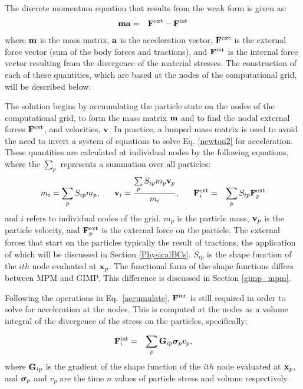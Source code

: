 The discrete momentum equation that results from the weak form is given as:
\begin{eqnarray}
        \bfm \bfa &=& \bfF^{\rm{ext}} - \bfF^{\rm{int}}  \label{newton2}
\end{eqnarray}
where $\bfm$ is the mass matrix, $\bfa$ is the acceleration vector,
$\bfF^{\rm{ext}}$ is the external force vector (sum of the body forces and
tractions), and $\bfF^{\rm{int}}$ is the internal force vector resulting from
the divergence of the material stresses.  The construction of each of these
quantities, which are based at the nodes of the computational grid,
will be described below.

The solution begins by accumulating the particle state on the
nodes of the computational grid, to form the mass matrix $\bfm$ and to find
the nodal external forces $\bfF^{\rm{ext}}$, and velocities,
$\bfv$.  In practice, a lumped mass matrix is used to avoid the need to
invert a system of equations to solve Eq. \ref{newton2} for acceleration.
These quantities are calculated at individual nodes by the following equations,
where the $\sum\limits_{p}$ represents a summation over all particles:
\begin{eqnarray}
m_i = \sum_{p} S_{ip} m_p,  \;\;\;\;\;\; 
\bfv_i = \frac{\sum\limits_{p} S_{ip} m_p \bfv_p}{m_i},  \;\;\;\;\;\;
\bfF^{\rm{ext}}_i &=& \sum_{p} S_{ip} \bfF^{\rm{ext}}_p
\label{accumulate}
\end{eqnarray}
and $i$ refers to individual nodes of the grid.  $m_p$ is the particle
mass, $\bfv_p$ is the particle velocity, and $\bfF^{\rm{ext}}_p$ is the
external force on the particle.  The external forces that start on the
particles typically the result of tractions, the application of which will
be discussed in Section \ref{PhysicalBCs}.
$S_{ip}$ is the shape function of the $ith$ node evaluated at $\bfx_p$.
The functional form of the shape functions differs between MPM and GIMP.
This difference is discussed in Section \ref{gimp_mpm}.

Following the operations in Eq.~\ref{accumulate}, $\bfF^{\rm{int}}$
is still required in order to solve for acceleration at the nodes.
This is computed at the nodes as a volume integral of the divergence
of the stress on the particles, specifically:

\begin{eqnarray}
\bfF^{\rm{int}}_i &=& \sum_{p} \bfG_{ip} \sig_p v_p,
\label{computeIntForce}  
\end{eqnarray}
where $\bfG_{ip}$ is the gradient of the shape function of the $ith$ node
evaluated at $\bfx_p$, and $\sig_p$ and $v_p$ are the time $n$ values of
particle stress and volume respectively.  

